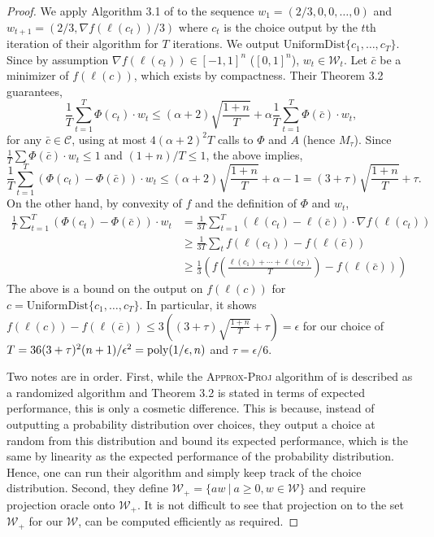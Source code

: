 \documentclass[final, 12pt]{colt2018} %
\def\calW{\mathcal{W}}
\newcommand{\eps}{\epsilon}
\def\calC{\mathcal{C}}
\newcommand{\poly}{\mathop{\mbox{\text{poly}}}}
\begin{document}
\begin{proof}
We apply Algorithm 3.1 of \cite{KakadeKL09} to the sequence $w_1=(2/3, 0,0, \ldots, 0)$ and $w_{t+1}=(2/3, \nabla f(\ell(c_t))/3)$ where $c_t$ is the choice output by the $t$th iteration of their algorithm for $T$ iterations.  We output $\mathrm{UniformDist}\{c_1,\ldots, c_T\}$.
Since by assumption $\nabla f(\ell(c_t)) \in [-1,1]^n$ ($[0,1]^n$), $w_t \in \calW_t$. Let $\bar{c}$ be a minimizer of $f(\ell(c))$, which exists by compactness. Their Theorem 3.2 guarantees,
$$\frac{1}{T} \sum_{t=1}^T \Phi(c_t) \cdot w_t \leq (\alpha + 2)\sqrt{\frac{1+n}{T}}+\alpha \frac{1}{T} \sum_{t=1}^T \Phi(\bar{c}) \cdot w_t,$$ 
for any $\bar{c} \in \calC$, using at most $4(\alpha+2)^2T$ calls to $\Phi$ and $A$ (hence $M_\tau$).
Since $\frac{1}{T}\sum \Phi(\bar{c}) \cdot w_t\leq 1$ and $(1+n)/T\leq 1$, the above implies,
$$\frac{1}{T} \sum_{t=1}^T (\Phi(c_t)-\Phi(\bar{c})) \cdot w_t \leq (\alpha + 2)\sqrt{\frac{1+n}{T}}+\alpha -1 = 
(3+\tau) \sqrt{\frac{1+n}{T}} + \tau.$$ 
On the other hand, by convexity of $f$ and the definition of $\Phi$ and $w_t$, 
\begin{align*}
\frac{1}{T} \sum_{t=1}^T (\Phi(c_t)-\Phi(\bar{c})) \cdot w_t &= \frac{1}{3T} \sum_{t=1}^T (\ell(c_t)-\ell(\bar{c})) \cdot \nabla f(\ell(c_t)) \\
&\geq \frac{1}{3T} \sum_t f(\ell(c_t))-f(\ell(\bar{c}))  \\
&\geq \frac{1}{3}\left(f\left(\frac{\ell(c_1)+\cdots + \ell(c_T)}{T}\right)-f(\ell(\bar{c}))\right)
\end{align*}
The above is a bound on the output on $f(\ell(c))$ for $c=\mathrm{UniformDist}\{c_1,\ldots, c_T\}$. In particular, it shows $f(\ell(c)) -f(\ell(\bar{c}))\leq  3((3+\tau) \sqrt{\frac{1+n}{T}} + \tau) = \eps$ for our choice of $T=36(3+\tau)^2(n+1)/\eps^2 = \poly(1/\eps, n)$ and $\tau=\eps/6$.

Two notes are in order. First, while the \textsc{Approx-Proj} algorithm of \cite{KakadeKL09} is described as a randomized algorithm and Theorem 3.2 is stated in terms of expected performance, this is only a cosmetic difference. This is because, instead of outputting a probability distribution over choices, they output a choice at random from this distribution and bound its expected performance, which is the same by linearity as the expected performance of the probability distribution. Hence, one can run their algorithm and simply keep track of the choice distribution. Second, they define $\calW_+=\{aw~|~a\geq 0, w\in \calW\}$ and require projection oracle onto $\calW_+$. It is not difficult to see that projection on to the set $\calW_+$ for our $\calW$, can be computed efficiently as required. 
\end{proof}
\end{document}
